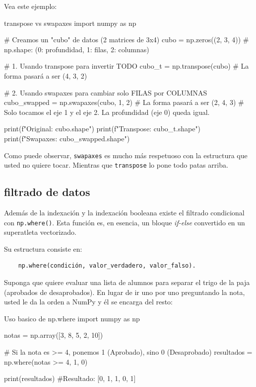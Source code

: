 Vea este ejemplo:

\begin{pycode}{transpose vs swapaxes}
import numpy as np

# Creamos un "cubo" de datos (2 matrices de 3x4)
cubo = np.zeros((2, 3, 4)) # np.shape: (0: profundidad, 1: filas, 2: columnas)

# 1. Usando transpose para invertir TODO
cubo_t = np.transpose(cubo) # La forma pasará a ser (4, 3, 2)

# 2. Usando swapaxes para cambiar solo FILAS por COLUMNAS
cubo_swapped = np.swapaxes(cubo, 1, 2) # La forma pasará a ser (2, 4, 3)
# Solo tocamos el eje 1 y el eje 2. La profundidad (eje 0) queda igual.

print(f"Original: {cubo.shape}")
print(f"Transpose: {cubo_t.shape}")
print(f"Swapaxes: {cubo_swapped.shape}")
\end{pycode}

Como puede observar, \texttt{swapaxes} es mucho más respetuoso con la estructura que usted no quiere tocar. Mientras que \texttt{transpose} lo pone todo patas arriba.




\subsection{filtrado de datos}

Además de la indexación y la indexación booleana existe el filtrado condicional con \texttt{np.where()}. Esta función es, en esencia, un bloque \textit{if-else} convertido en un superatleta vectorizado.

Su estructura consiste en:
\begin{verbatim}
    np.where(condición, valor_verdadero, valor_falso).
\end{verbatim}

Suponga que quiere evaluar una lista de alumnos para separar el trigo de la paja (aprobados de desaprobados). En lugar de ir uno por uno preguntando la nota, usted le da la orden a NumPy y él se encarga del resto:
\begin{pycode}{Uso basico de np.where}
import numpy as np

notas = np.array([3, 8, 5, 2, 10])

# Si la nota es >= 4, ponemos 1 (Aprobado), sino 0 (Desaprobado)
resultados = np.where(notas >= 4, 1, 0)

print(resultados) #Resultado: [0, 1, 1, 0, 1]
\end{pycode}

